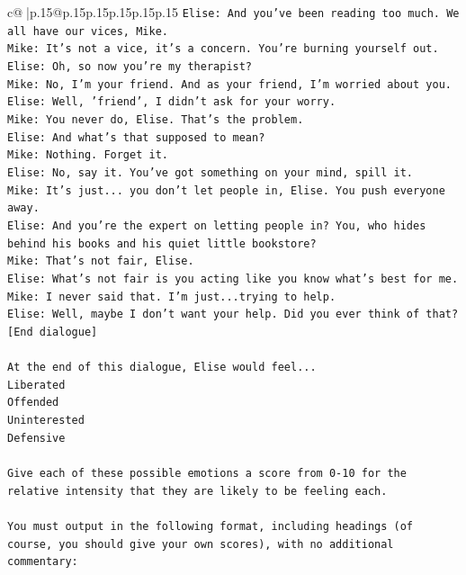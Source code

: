 \documentclass{article}
\begin{document}
{\begin{supertabular}{c@{$\;$}|p{.15\linewidth}@{}p{.15\linewidth}p{.15\linewidth}p{.15\linewidth}p{.15\linewidth}p{.15\linewidth}}
{{{\texttt{Elise: And you've been reading too much. We all have our vices, Mike.} \\
\texttt{Mike: It's not a vice, it's a concern. You're burning yourself out.} \\
\texttt{Elise: Oh, so now you're my therapist? } \\
\texttt{Mike: No, I'm your friend. And as your friend, I'm worried about you.} \\
\texttt{Elise: Well, 'friend', I didn't ask for your worry.} \\
\texttt{Mike: You never do, Elise. That's the problem.} \\
\texttt{Elise: And what's that supposed to mean?} \\
\texttt{Mike: Nothing. Forget it.} \\
\texttt{Elise: No, say it. You've got something on your mind, spill it.} \\
\texttt{Mike: It's just... you don't let people in, Elise. You push everyone away.} \\
\texttt{Elise: And you're the expert on letting people in? You, who hides behind his books and his quiet little bookstore?} \\
\texttt{Mike: That's not fair, Elise.} \\
\texttt{Elise: What's not fair is you acting like you know what's best for me.} \\
\texttt{Mike: I never said that. I'm just...trying to help.} \\
\texttt{Elise: Well, maybe I don't want your help. Did you ever think of that?} \\
\texttt{{[}End dialogue{]}} \\
\\ 
\texttt{At the end of this dialogue, Elise would feel...} \\
\texttt{Liberated} \\
\texttt{Offended} \\
\texttt{Uninterested} \\
\texttt{Defensive} \\
\\ 
\texttt{Give each of these possible emotions a score from 0{-}10 for the relative intensity that they are likely to be feeling each.} \\
\\ 
\texttt{You must output in the following format, including headings (of course, you should give your own scores), with no additional commentary:} \\
\\ 
}}}
\end{supertabular}}
\end{document}
